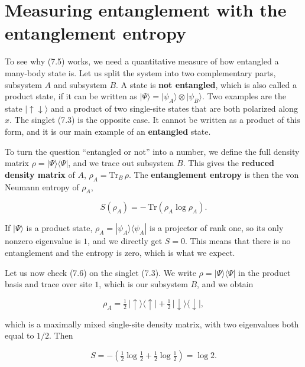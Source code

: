\section{Measuring entanglement with the entanglement entropy}

To see why (7.5) works, we need a quantitative measure of how entangled a many-body state is. Let us
split the system into two complementary parts, subsystem $A$ and subsystem $B$. A state is \textbf{not
entangled}, which is also called a product state, if it can be written as $|\Psi\rangle = |\psi_A\rangle
\otimes
|\psi_B\rangle$. Two examples are the state $|{\uparrow\downarrow}\rangle$ and a product of two
single-site states that are both polarized along $x$. The singlet (7.3) is the opposite case. It cannot
be written as a product of this form, and it is our main example of an \textbf{entangled} state.

To turn the question ``entangled or not'' into a number, we define the full density matrix $\rho =
|\Psi\rangle
\langle\Psi|$, and we trace out subsystem $B$. This gives the \textbf{reduced density matrix} of $A$,
$\rho_A =
\mathrm{Tr}_B\,\rho$. The \textbf{entanglement entropy} is then the von Neumann entropy of $\rho_A$,

\begin{equation}
S(\rho_A) = -\,\mathrm{Tr}\!\left(\rho_A \log \rho_A\right).
\end{equation}

If $|\Psi\rangle$ is a product state, $\rho_A = |\psi_A\rangle\langle\psi_A|$ is a projector of rank
one, so its only nonzero eigenvalue is $1$, and we directly get $S=0$. This means that there is no
entanglement and the entropy is zero, which is what we expect.

Let us now check (7.6) on the singlet (7.3). We write $\rho = |\Psi\rangle\langle\Psi|$ in the product
basis and trace over site $1$, which is our subsystem $B$, and we obtain

\begin{equation*}
\rho_A = \tfrac{1}{2}\,|{\uparrow}\rangle\langle{\uparrow}| + \tfrac{1}{2}\,
|{\downarrow}\rangle\langle{\downarrow}|,
\end{equation*}

which is a maximally mixed single-site density matrix, with two eigenvalues both equal to $1/2$. Then

\begin{equation}
S = -\left(\tfrac12\log\tfrac12 + \tfrac12\log\tfrac12\right) = \log 2.
\end{equation}


